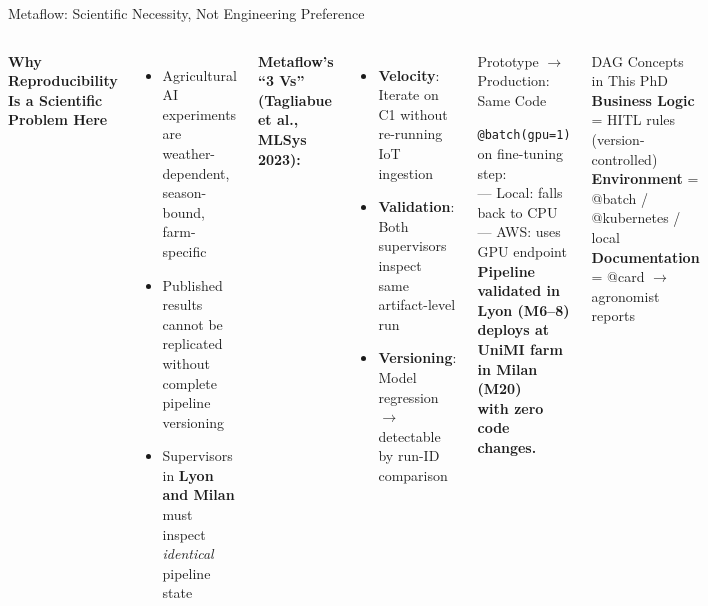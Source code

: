 \documentclass[aspectratio=169,10pt]{beamer}
\begin{document}
\begin{frame}{Metaflow: Scientific Necessity, Not Engineering Preference}

\begin{columns}[T]
\textbf{Why Reproducibility Is a Scientific Problem Here}
\begin{itemize}\small
  \item Agricultural AI experiments are weather-dependent, season-bound, farm-specific
  \item Published results cannot be replicated without complete pipeline versioning
  \item Supervisors in \textbf{Lyon and Milan} must inspect \emph{identical} pipeline state
\end{itemize}

\medskip
\textbf{Metaflow's ``3 Vs'' (Tagliabue et al., MLSys 2023):}
\begin{itemize}\small
  \item \textbf{Velocity}: Iterate on C1 without re-running IoT ingestion
  \item \textbf{Validation}: Both supervisors inspect same artifact-level run
  \item \textbf{Versioning}: Model regression $\to$ detectable by run-ID comparison
\end{itemize}

\begin{block}{Prototype $\to$ Production: Same Code}
\begin{center}
\small
\texttt{@batch(gpu=1)} on fine-tuning step:\\
--- Local: falls back to CPU\\
--- AWS: uses GPU endpoint\\[4pt]
\textbf{Pipeline validated in Lyon (M6--8)\\
deploys at UniMI farm in Milan (M20)\\
with zero code changes.}
\end{center}
\end{block}

\medskip
\begin{block}{DAG Concepts in This PhD}
\small
\textbf{Business Logic} = HITL rules (version-controlled)\\
\textbf{Environment} = @batch / @kubernetes / local\\
\textbf{Documentation} = @card $\to$ agronomist reports
\end{block}
\end{columns}

\end{frame}
\end{document}
